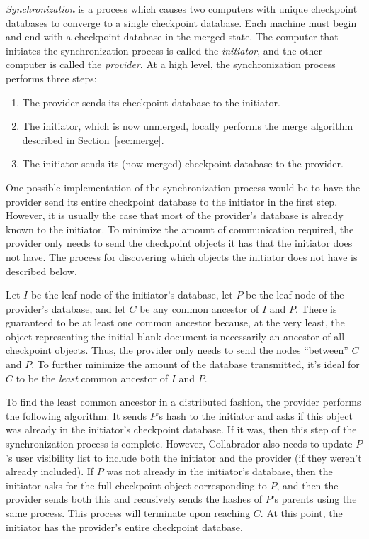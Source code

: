\documentclass[11pt,titlepage]{article}
\begin{document}
\emph{Synchronization} is a process which causes two computers with 
unique checkpoint databases to converge to a single checkpoint database. 
Each machine must begin and end with a checkpoint database in the merged 
state. The computer that initiates the synchronization
process is called the \emph{initiator}, and the other computer is
called the \emph{provider}. At a high level, the synchronization
process performs three steps:
\begin{enumerate}
\item The provider sends its checkpoint database to the initiator.
\item The initiator, which is now unmerged, locally performs the merge
  algorithm described in Section~\ref{sec:merge}.
\item The initiator sends its (now merged) checkpoint database to the
  provider.
\end{enumerate}
One possible implementation of the synchronization process would be to
have the provider send its entire checkpoint database to the initiator
in the first step. However, it is usually the case that most of the
provider's database is already known to the initiator. To minimize the
amount of communication required, the provider only needs to send the
checkpoint objects it has that the initiator does not have. The process 
for discovering which objects the initiator does not have is described 
below.

Let $I$ be the leaf node of the initiator's database, let $P$ be the
leaf node of the provider's database, and let $C$ be any common
ancestor of $I$ and $P$. There is guaranteed to be at least one common
ancestor because, at the very least, the object representing the
initial blank document is necessarily an ancestor of all checkpoint
objects. Thus, the provider only needs to send the nodes ``between''
$C$ and $P$. To further minimize the amount of the database
transmitted, it's ideal for $C$ to be the \emph{least} common ancestor
of $I$ and $P$.

To find the least common ancestor in a distributed fashion, the
provider performs the following algorithm: It sends $P$'s hash to the
initiator and asks if this object was already in the initiator's
checkpoint database. If it was, then this step of the synchronization
process is complete. However, Collabrador also needs to update $P$'s
user visibility list to include both the initiator and the provider
(if they weren't already included). If $P$ was not already in the
initiator's database, then the initiator asks for the full checkpoint
object corresponding to $P$, and then the provider sends both this and
recusively sends the hashes of $P$'s parents using the same
process. This process will terminate upon reaching $C$. At this point,
the initiator has the provider's entire checkpoint database.
\end{document}
